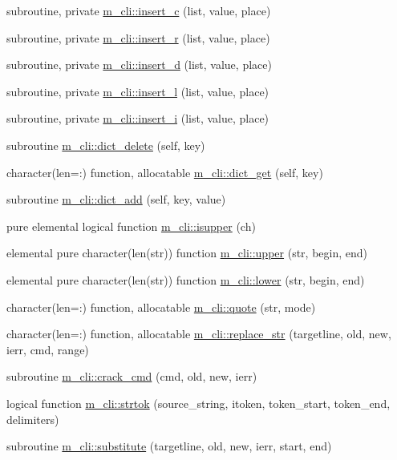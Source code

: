 \begin{DoxyCompactItemize}
\item 
subroutine, private \mbox{\hyperlink{namespacem__cli_a9baf1cf0e20942fbde8c025ead5a30db}{m\+\_\+cli\+::insert\+\_\+c}} (list, value, place)
\item 
subroutine, private \mbox{\hyperlink{namespacem__cli_a4bfb90e14824f94017b1d4fcb39f0701}{m\+\_\+cli\+::insert\+\_\+r}} (list, value, place)
\item 
subroutine, private \mbox{\hyperlink{namespacem__cli_a030e31579a7968aea68d80db1e36ebfd}{m\+\_\+cli\+::insert\+\_\+d}} (list, value, place)
\item 
subroutine, private \mbox{\hyperlink{namespacem__cli_a0c1b22c46470afbb4ee5c67180335578}{m\+\_\+cli\+::insert\+\_\+l}} (list, value, place)
\item 
subroutine, private \mbox{\hyperlink{namespacem__cli_a841685591ef1f1827fc1fe32a7f546f1}{m\+\_\+cli\+::insert\+\_\+i}} (list, value, place)
\item 
subroutine \mbox{\hyperlink{namespacem__cli_aff32e44070983c7fb4eb0a3b1dea7a6d}{m\+\_\+cli\+::dict\+\_\+delete}} (self, key)
\item 
character(len=\+:) function, allocatable \mbox{\hyperlink{namespacem__cli_ac4a889309ffc333af6bf8e11f1fc4869}{m\+\_\+cli\+::dict\+\_\+get}} (self, key)
\item 
subroutine \mbox{\hyperlink{namespacem__cli_a1be098e2b920e8d50ed14be03a3133db}{m\+\_\+cli\+::dict\+\_\+add}} (self, key, value)
\item 
pure elemental logical function \mbox{\hyperlink{namespacem__cli_a4c126288dc18289b2095a0882f10ca77}{m\+\_\+cli\+::isupper}} (ch)
\item 
elemental pure character(len(str)) function \mbox{\hyperlink{namespacem__cli_aef6f54c9cb37251dfd664c0845186a40}{m\+\_\+cli\+::upper}} (str, begin, end)
\item 
elemental pure character(len(str)) function \mbox{\hyperlink{namespacem__cli_a685574282a09c3f57e0c18654a3a642c}{m\+\_\+cli\+::lower}} (str, begin, end)
\item 
character(len=\+:) function, allocatable \mbox{\hyperlink{namespacem__cli_ac82fec2a5441020701fe3c64af3d9948}{m\+\_\+cli\+::quote}} (str, mode)
\item 
character(len=\+:) function, allocatable \mbox{\hyperlink{namespacem__cli_a40e02b1c9fc580ddd410bb24017fab8c}{m\+\_\+cli\+::replace\+\_\+str}} (targetline, old, new, ierr, cmd, range)
\item 
subroutine \mbox{\hyperlink{namespacem__cli_a8d5d1954aac6494e07fb11f12f635c85}{m\+\_\+cli\+::crack\+\_\+cmd}} (cmd, old, new, ierr)
\item 
logical function \mbox{\hyperlink{namespacem__cli_a0015c38f9fa45a58ba6ae89f2ddb54f1}{m\+\_\+cli\+::strtok}} (source\+\_\+string, itoken, token\+\_\+start, token\+\_\+end, delimiters)
\item 
subroutine \mbox{\hyperlink{namespacem__cli_a3b66fe9cee0e084068051636afb2957d}{m\+\_\+cli\+::substitute}} (targetline, old, new, ierr, start, end)
\end{DoxyCompactItemize}
